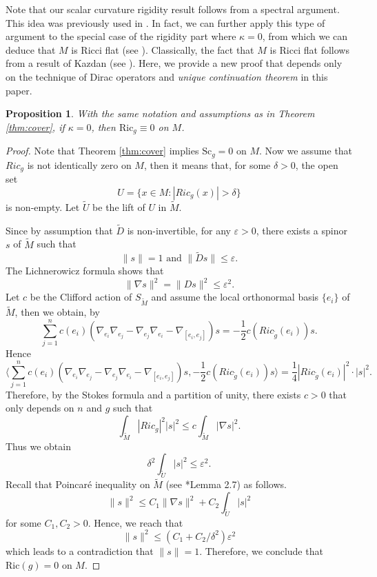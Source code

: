 \documentclass[12pt, reqno]{amsart}
\theoremstyle{plain}%
\newtheorem{proposition}[theorem]{Proposition}
\theoremstyle{definition}
\theoremstyle{remark}
\numberwithin{equation}{section}
\newcommand{\Sc}{\mathrm{Sc}}
\newcommand{\Ric}{\mathrm{Ric}}
\begin{document}
Note that our scalar curvature rigidity result follows from a spectral argument. This idea was previously used in \cites{WangXie25,MR4855340}. In fact, we can further apply this type of argument to the special case of the rigidity part where $\kappa=0$, from which we can deduce that $M$ is Ricci flat (see \cite{GromovLawson}). Classically, the fact that $M$ is Ricci flat follows from a result of Kazdan (see \cite{Kazdan}). Here, we provide a new proof that depends only on the technique of Dirac operators and \emph{unique continuation theorem} in this paper.

\begin{proposition} \label{prop: Ricci_flat}
    With the same notation and assumptions as in Theorem \ref{thm:cover}, if $\kappa = 0$, then $\Ric_g \equiv 0$ on $M$. 
\end{proposition}
\begin{proof}
    Note that Theorem \ref{thm:cover} implies  $\Sc_g=0$  on $M$.
    Now we assume  that $Ric_g$ is not identically zero on $M$, then it means that, for some $\delta>0$, the open set
    $$U=\{x\in M: |Ric_g(x)|>\delta\}$$
    is non-empty. Let $\widetilde U$ be the lift of $U$ in $\widetilde M$. 

    Since by assumption that $\widetilde D$ is non-invertible, for any $\varepsilon>0$, there exists a spinor $s$ of $\widetilde M$ such that
    $$\|s\|=1\text{ and }\|\widetilde D s\|\leq\varepsilon.$$
    The Lichnerowicz formula shows that
    $$\|\nabla s\|^2=\|Ds\|^2\leq \varepsilon^2.$$
    Let $c$ be the Clifford action of $S_{\widetilde M}$ and assume the local orthonormal basis $\{e_i\}$ of $\widetilde M$, then we obtain,  by \cite[Corollary 2.9]{spinorialapproach}
    $$\sum_{j=1}^nc(e_i)(\nabla_{e_i}\nabla_{e_j}-\nabla_{e_j}\nabla_{e_i}-\nabla_{[e_i,e_j]})s=-\frac 1 2c(Ric_{\widetilde g}(e_i))s.$$
    Hence
    $$\langle\sum_{j=1}^nc(e_i)(\nabla_{e_i}\nabla_{e_j}-\nabla_{e_j}\nabla_{e_i}-\nabla_{[e_i,e_j]})s,-\frac 1 2c(Ric_{\widetilde g}(e_i))s\rangle=\frac 1 4|Ric_{\widetilde g}(e_i)|^2\cdot|s|^2.$$
    Therefore, by the Stokes formula and a partition of unity, there exists $c>0$ that only depends on $n$ and $g$ such that
    $$\int_{\widetilde M}|Ric_g|^2|s|^2\leq c\int_{\widetilde M}|\nabla s|^2.$$
    Thus we obtain
    $$\delta^2\int_{\widetilde U}|s|^2\leq \varepsilon^2.$$
    Recall that Poincar\'{e} inequality on $\widetilde M$ (see \cite{WangXie25}*{Lemma 2.7}) as follows.
    $$\|s\|^2\leq C_1\|\nabla s\|^2+C_2\int_{\widetilde U}|s|^2$$
    for some $C_1,C_2>0$. Hence, we reach that $$\|s\|^2\leq (C_1+C_2/\delta^2)\varepsilon^2$$ which leads to a contradiction that $\|s\|=1$. Therefore, we conclude that $\Ric(g) = 0$ on $M$.
\end{proof}
\end{document}
